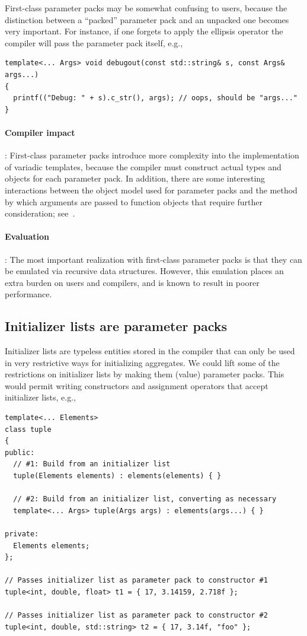 \documentclass{article}
\begin{document}
First-class parameter packs may be somewhat confusing to users,
because the distinction between a ``packed'' parameter pack and an
unpacked one becomes very important. For instance, if one forgets to
apply the ellipsis operator the compiler will pass the parameter pack
itself, e.g.,
\begin{verbatim}
template<... Args> void debugout(const std::string& s, const Args& args...)
{
  printf(("Debug: " + s).c_str(), args); // oops, should be "args..."
}
\end{verbatim}

\paragraph{Compiler impact}: First-class parameter packs introduce
more complexity into the implementation of variadic templates, because
the compiler must construct actual types and objects for each
parameter pack. In addition, there are some interesting interactions
between the object model used for parameter packs and the method by
which arguments are passed to function objects that require further
consideration; see~\cite{GJP04a}. 

\paragraph{Evaluation}: The most important realization with
first-class parameter packs is that they can be emulated via recursive
data structures. However, this emulation places an extra burden on
users and compilers, and is known to result in poorer performance.

\subsection{Initializer lists are parameter packs}
Initializer lists are typeless entities stored in the compiler that
can only be used in very restrictive ways for initializing
aggregates. We could lift some of the restrictions on initializer
lists by making them (value) parameter packs. This would permit writing
constructors and assignment operators that accept initializer lists,
e.g.,

\begin{verbatim}
template<... Elements>
class tuple
{
public:
  // #1: Build from an initializer list
  tuple(Elements elements) : elements(elements) { }

  // #2: Build from an initializer list, converting as necessary
  template<... Args> tuple(Args args) : elements(args...) { }

private:
  Elements elements;
};

// Passes initializer list as parameter pack to constructor #1
tuple<int, double, float> t1 = { 17, 3.14159, 2.718f };
  
// Passes initializer list as parameter pack to constructor #2
tuple<int, double, std::string> t2 = { 17, 3.14f, "foo" };
\end{verbatim}
\end{document}
